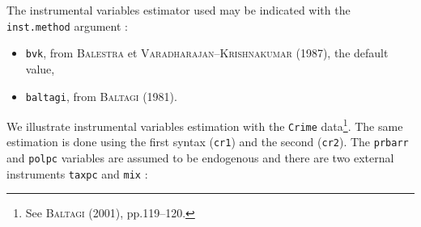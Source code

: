 \documentclass{article}
\begin{document}
The instrumental variables estimator used may be indicated with the
\texttt{inst.method} argument :
\begin{itemize}
\item \texttt{bvk}, from  \textsc{Balestra} et
  \textsc{Varadharajan--Krishnakumar} (1987), the default value,
\item \texttt{baltagi}, from \textsc{Baltagi} (1981).
\end{itemize}

We illustrate instrumental variables estimation with the
\texttt{Crime} data\footnote{See
  \textsc{Baltagi} (2001), pp.119--120.}. 
The same estimation is done using the first syntax  (\texttt{cr1}) and
the second (\texttt{cr2}). The  \texttt{prbarr} and \texttt{polpc}
variables are
assumed to be endogenous and there are two external instruments \texttt{taxpc} and \texttt{mix} :
\end{document}

